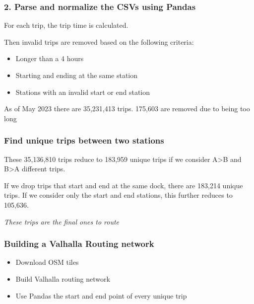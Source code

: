 \documentclass{beamer}
\begin{document}
\begin{frame}
    \frametitle{2. Parse and normalize the CSVs using Pandas}
    
    For each trip, the trip time is calculated. 
    
    Then invalid trips are removed based on the following criteria: 
    \begin{itemize}
        \item Longer than a 4 hours


        \item Starting and ending at the same station


        \item Stations with an invalid start or end station

    \end{itemize}

    As of May 2023 there are 35,231,413 trips. 175,603 are removed due to being too long
\end{frame}

\begin{frame}
    \frametitle{Find unique trips between two stations}
    These 35,136,810 trips reduce to 183,959 unique trips if we consider A>B and B>A different trips.

    

    If we drop trips that start and end at the same dock, there are 183,214 unique trips. If we consider only the start and end stations, this further reduces to 105,636.

    \emph{These trips are the final ones to route}
\end{frame}

\begin{frame}
    \frametitle{Building a Valhalla Routing network}

    \begin{itemize}
        \item Download OSM tiles
        \item Build Valhalla routing network
        \item Use Pandas the start and end point of every unique trip
    \end{itemize}
\end{frame}
\end{document}
